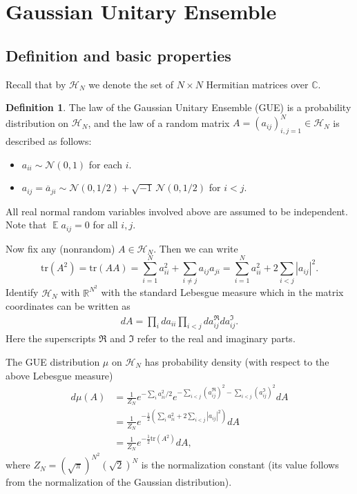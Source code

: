 \documentclass[letterpaper,11pt,oneside,reqno]{amsart}
\numberwithin{equation}{section}
\DeclareMathOperator{\EE}{\mathbb{E}}
\theoremstyle{definition}
\newtheorem{definition}[proposition]{Definition}
\begin{document}


\section{Gaussian Unitary Ensemble} %
\label{sec:gaussian_unitary_ensemble}

\subsection{Definition and basic properties} %
\label{sub:definition_and_basic_properties}

Recall that by $\mathcal H_N$ we denote the set of $N \times N$ Hermitian matrices over $\mathbb{C}$. 

\begin{definition}
  The law of the Gaussian Unitary Ensemble (GUE) is 
  a probability distribution on $\mathcal H_N$, and the law of 
  a random matrix $A=(a_{ij})_{i,j=1}^N\in\mathcal H_N$ is described as follows:
  \begin{itemize}
    \item $a_{ii} \sim \mathcal N(0,1)$ for each $i$.
    \item $a_{ij}=\overline{a}_{ji}\sim \mathcal N(0,1/2)+ \sqrt{-1}\, \mathcal N(0,1/2)$ for $i<j$.
  \end{itemize}
  All real normal random variables involved above are assumed to be independent.
  Note that $\EE a_{ij}=0$ for all $i,j$.
\end{definition}

Now fix any (nonrandom) $A\in \mathcal H_N$. Then we can write
\begin{equation*}
  \mathrm{tr}(A^2)=\mathrm{tr}(AA)=\sum_{i=1}^N a_{ii}^2+\sum_{i\neq j} a_{ij}a_{ji}=\sum_{i=1}^N a_{ii}^2+2\sum_{i<j} |a_{ij}|^2.
\end{equation*}
Identify $\mathcal H_N$ with $\mathbb{R}^{N^2}$ with the standard Lebesgue measure
which in the matrix coordinates can be written as
\begin{align*}
  dA = \prod_i d a_{ii} \prod_{i<j} da_{ij}^{\Re} da_{ij}^\Im.
\end{align*}
Here the superscripts $\Re$ and $\Im$ refer to the real and imaginary parts.

The GUE distribution $\mu$ on $\mathcal H_N$
has probability density (with respect to the above Lebesgue measure)
\begin{align*}
  d\mu(A) &=\frac{1}{Z_N}e^{-\sum_{i}a_{ii}^2/2}
  e^{-\sum_{i<j}(a_{ij}^{\Re})^2-\sum_{i<j}(a_{ij}^{\Im})^2} dA \\
  &= \frac{1}{Z_N}e^{-\frac{1}{2}(\sum_i a_{ii}^2+2\sum_{i<j}|a_{ij}|^2)} dA\\
  &= \frac{1}{Z_N} e^{-\frac{1}{2} \mathrm{tr}(A^2)} dA,
\end{align*}
where $Z_N=(\sqrt{\pi})^{N^2} (\sqrt{2})^N$ is the normalization constant (its value
follows from the normalization of the Gaussian distribution).
\end{document}
